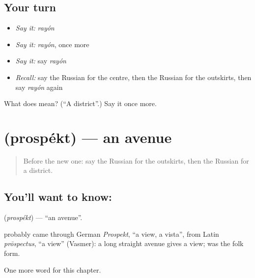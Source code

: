 \subsection*{Your turn}
\begin{itemize}
\raggedright
  \item \emph{Say it:} \emph{rayón}
  \item \emph{Say it:} \emph{rayón}, once more
  \item \emph{Say it:} say \emph{rayón}
  \item \emph{Recall:} say the Russian for the centre, then the Russian for the outskirts, then say \emph{rayón} again
\end{itemize}

\begin{tcolorbox}[breakable,colback=teal!4,colframe=teal!35!black,title={Before you move on}]
What does  mean? (\textquotedblleft{}A district\textquotedblright{}.) Say it once more.
\end{tcolorbox}
\section[\texorpdfstring{\ru{проспект} (prospékt)}{проспект (prospékt)}]{ (prospékt) — an avenue}

\label{lesson:RU-C151-prospekt}



\begin{quote}
Before the new one: say the Russian for the outskirts, then the Russian for a district.
\end{quote}

\subsection*{You'll want to know: }
\textbf{} (\emph{prospékt}) — \textquotedblleft{}an avenue\textquotedblright{}.

\begin{cousinweb}
\textbf{} probably came through German \emph{Prospekt}, \textquotedblleft{}a view, a vista\textquotedblright{}, from Latin \emph{prōspectus}, \textquotedblleft{}a view\textquotedblright{} (Vasmer): a long straight avenue gives a view; \emph{} was the folk form.
\end{cousinweb}

\begin{grammarlens}[title={What you've built}]
One more word for this chapter.
\end{grammarlens}

